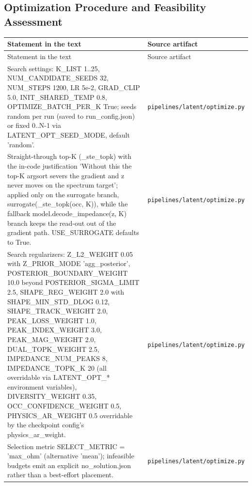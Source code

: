 \subsection*{Optimization Procedure and Feasibility Assessment}
\begingroup\small
\begin{longtable}{p{} p{}}
\hline
Statement in the text & Source artifact \\
\hline
\endfirsthead
\hline
Statement in the text & Source artifact \\
\hline
\endhead
Search settings: K\_LIST 1..25, NUM\_CANDIDATE\_SEEDS 32, NUM\_STEPS 1200, LR 5e-2, GRAD\_CLIP 5.0, INIT\_SHARED\_TEMP 0.8, OPTIMIZE\_BATCH\_PER\_K True; seeds random per run (saved to run\_config.json) or fixed 0..N-1 via LATENT\_OPT\_SEED\_MODE, default 'random'. & \texttt{pipelines/\allowbreak{}latent/\allowbreak{}optimize.py} \\
Straight-through top-K (\_ste\_topk) with the in-code justification 'Without this the top-K argsort severs the gradient and z never moves on the spectrum target'; applied only on the surrogate branch, surrogate(\_ste\_topk(occ, K)), while the fallback model.decode\_impedance(z, K) branch keeps the read-out out of the gradient path. USE\_SURROGATE defaults to True. & \texttt{pipelines/\allowbreak{}latent/\allowbreak{}optimize.py} \\
Search regularizers: Z\_L2\_WEIGHT 0.05 with Z\_PRIOR\_MODE 'agg\_posterior', POSTERIOR\_BOUNDARY\_WEIGHT 10.0 beyond POSTERIOR\_SIGMA\_LIMIT 2.5, SHAPE\_REG\_WEIGHT 2.0 with SHAPE\_MIN\_STD\_DLOG 0.12, SHAPE\_TRACK\_WEIGHT 2.0, PEAK\_LOSS\_WEIGHT 1.0, PEAK\_INDEX\_WEIGHT 3.0, PEAK\_MAG\_WEIGHT 2.0, DUAL\_TOPK\_WEIGHT 2.5, IMPEDANCE\_NUM\_PEAKS 8, IMPEDANCE\_TOPK\_K 20 (all overridable via LATENT\_OPT\_* environment variables), DIVERSITY\_WEIGHT 0.35, OCC\_CONFIDENCE\_WEIGHT 0.5, PHYSICS\_AR\_WEIGHT 0.5 overridable by the checkpoint config's physics\_ar\_weight. & \texttt{pipelines/\allowbreak{}latent/\allowbreak{}optimize.py} \\
Selection metric SELECT\_METRIC = 'max\_ohm' (alternative 'mean'); infeasible budgets emit an explicit no\_solution.json rather than a best-effort placement. & \texttt{pipelines/\allowbreak{}latent/\allowbreak{}optimize.py} \\
\hline
\end{longtable}
\endgroup

